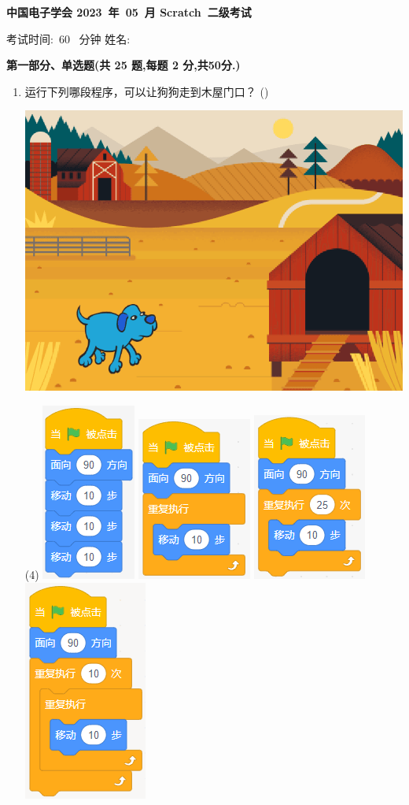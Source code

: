\documentclass[10pt, a4paper]{article}
\newcommand{\Title}[3]{
    \begin{center}
        \Large \textbf{中国电子学会 #1~年~#2~月 Scratch~#3级考试}
    \end{center}
}
\newcommand{\TimeAndName}[1]{
    \begin{center}
        考试时间:~#1~ 分钟 \qquad\qquad\qquad\qquad 姓名:\underline{\quad\quad\quad\quad}
    \end{center}
}
\newcommand{\hq}{\hfill(\qquad)}
\begin{document}
    \Title{2023}{05}{二} %
    \TimeAndName{60} %

    \vspace{2mm}
    {\noindent\textbf{第一部分、单选题(共 25 题,每题 2 分,共50分.)}}
    \begin{enumerate}
        \item 运行下列哪段程序，可以让狗狗走到木屋门口？ \hq
        
        \begin{minipage}{.2\textwidth}
            \centering
            \includegraphics[width=.9\textwidth]{figure/1.png}
        \end{minipage}
        \begin{minipage}{.7\textwidth}
            \begin{tasks}(4)
                \task \includegraphics[width=.1\textwidth]{figure/1a.png}
                \task \includegraphics[width=.13\textwidth]{figure/1b.png}
                \task \includegraphics[width=.13\textwidth]{figure/1c.png}
                \task \includegraphics[width=.11\textwidth]{figure/1d.png}
            \end{tasks}
        \end{minipage}


\end{enumerate}
\end{document}
